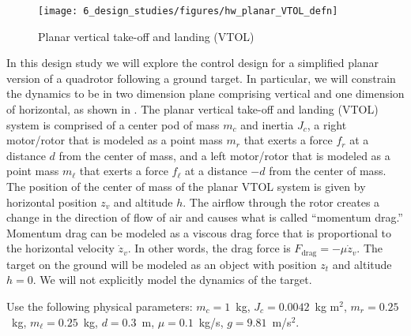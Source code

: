 
\begin{wrapfigure}{r}{0.6\textwidth}
  \centering
  \texttt{[image: 6\_design\_studies/figures/hw\_planar\_VTOL\_defn]}\\
  \caption{Planar vertical take-off and landing (VTOL)}
  \label{fig:planar_VTOL_defn}
\end{wrapfigure}

In this design study we will explore the control design for a simplified planar version of a quadrotor following a ground target.  In particular, we will constrain the dynamics to be in two dimension plane comprising vertical and one dimension of horizontal, as shown in .  The planar vertical take-off and landing (VTOL) system is comprised of a center pod of mass $m_c$ and inertia $J_c$, a right motor/rotor that is modeled as a point mass $m_r$ that exerts a force $f_r$ at a distance $d$ from the center of mass, and a left motor/rotor that is modeled as a point mass $m_\ell$ that exerts a force $f_\ell$ at a distance $-d$ from the center of mass.  The position of the center of mass of the planar VTOL system is given by horizontal position $z_v$ and altitude $h$.  The airflow through the rotor creates a change in the direction of flow of air and causes what is called ``momentum drag.''  Momentum drag can be modeled as a viscous drag force that is proportional to the horizontal velocity $\dot{z}_v$.  In other words, the drag force is $F_{\text{drag}}=-\mu \dot{z}_v$.  The target on the ground will be modeled as an object with position $z_t$ and altitude $h=0$.  We will not explicitly model the dynamics of the target.  

Use the following physical parameters:
$m_c=1$~kg,
$J_c=0.0042$~kg m$^2$,
$m_r=0.25$~kg,
$m_\ell=0.25$~kg,
$d=0.3$~m,
$\mu = 0.1$~kg/s,
$g=9.81$~m/s$^2$.

